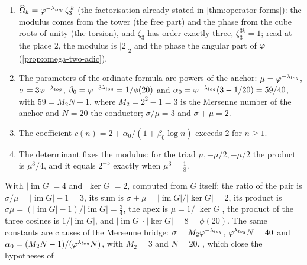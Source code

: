 \begin{proposition}\sloppy\label{prop:spectrum-free-torsion}
\begin{enumerate}[label=\textup{(\roman*)}]
  \item $\widehat{\Omega}_k=\varphi^{-\lambda_{log}}\,\zeta_3^{\,k}$ (the factorisation already stated in
    \cref{thm:operator-forms}): the modulus comes from the tower (the free part) and the
    phase from the cube roots of unity (the torsion), and $\zeta_3$ has order exactly three, $\zeta_3^{3k}=1$; read at the place $2$, the modulus is $|2|_2$ and the phase the angular part of $\varphi$ (\cref{prop:omega-two-adic}).
  \item The parameters of the ordinate formula are powers of the anchor:
    $\mu=\varphi^{-\lambda_{log}}$, $\sigma=3\varphi^{-\lambda_{log}}$, $\beta_0=\varphi^{-3\lambda_{log}}=1/\phi(20)$ and
    $\alpha_0=\varphi^{-\lambda_{log}}(3-1/20)=59/40$, with $59=M_2N-1$, where $M_2=2^2-1=3$ is the Mersenne number of the anchor and $N=20$ the conductor; $\sigma/\mu=3$ and
    $\sigma+\mu=2$.
  \item The coefficient $c(n)=2+\alpha_0/(1+\beta_0\log n)$ exceeds $2$ for $n\ge1$.
  \item The determinant fixes the modulus: for the triad $\mu,-\mu/2,-\mu/2$ the product is
    $\mu^3/4$, and it equals $2^{-5}$ exactly when $\mu^3=\tfrac18$.
\end{enumerate}
%
\end{proposition}

\begin{proposition}\label{prop:pair-from-G}
With $|\operatorname{im}G|=4$ and $|\ker G|=2$, computed from $G$ itself: the ratio of the
pair is $\sigma/\mu=|\operatorname{im}G|-1=3$, its sum is
$\sigma+\mu=|\operatorname{im}G|/|\ker G|=2$, its product is
$\sigma\mu=(|\operatorname{im}G|-1)/|\operatorname{im}G|=\tfrac34$, the apex is
$\mu=1/|\ker G|$, the product of the three cosines is $1/|\operatorname{im}G|$, and
$|\operatorname{im}G|\cdot|\ker G|=8=\phi(20)$.  The same constants are clauses of the
Mersenne bridge: $\sigma=M_2\varphi^{-\lambda_{log}}$, $\varphi^{\lambda_{log}}N=40$ and
$\alpha_0=(M_2N-1)/(\varphi^{\lambda_{log}}N)$, with $M_2=3$ and $N=20$.
, which
close the hypotheses of %
\end{proposition}

